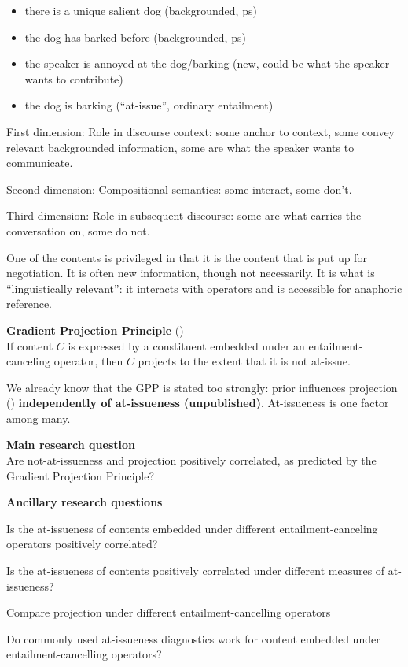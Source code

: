 \documentclass[11pt,fleqn]{article}
\newcommand{\6}{\mbox{$[\hspace*{-.6mm}[$}}
\newcommand{\9}{\mbox{$]\hspace*{-.6mm}]$}}
\begin{document}
\begin{itemize}
\item there is a unique salient dog (backgrounded, ps)
\item the dog has barked before (backgrounded, ps)
\item the speaker is annoyed at the dog/barking (new, could be what the speaker wants to contribute)
\item the dog is barking (``at-issue'', ordinary entailment)
\end{itemize}

First dimension: Role in discourse context: some anchor to context, some convey relevant backgrounded information, some are what the speaker wants to communicate.

Second dimension: Compositional semantics: some interact, some don't.

Third dimension: Role in subsequent discourse: some are what carries the conversation on, some do not.


One of the contents is privileged in that it is the content that is put up for negotiation. It is often new information, though not necessarily. It is what is ``linguistically relevant'': it interacts with operators and is accessible for anaphoric reference.


\begin{exe}
\ex\label{gpp} {\bf Gradient Projection Principle} \hfill (\citealt[400]{tbd-variability}) \\ If content $C$ is expressed by a constituent embedded under an entailment-canceling operator, then $C$ projects to the extent that it is not at-issue.
\end{exe}

We already know that the GPP is stated too strongly: prior influences projection (\citealt{degen-tonhauser-openmind}) {\bf independently of at-issueness (unpublished)}. At-issueness is one factor among many.


\begin{exe}
\ex\label{rqs} {\bf Main research question} \\
Are not-at-issueness and projection positively correlated, as predicted by the Gradient Projection Principle?
\end{exe}

\begin{exe}
\ex\label{rqs} {\bf Ancillary research questions}
\begin{xlist}

\ex Is the at-issueness of contents embedded under different entailment-canceling operators positively correlated?

\ex Is the at-issueness of contents positively correlated under different measures of at-issueness?

\ex Compare projection under different entailment-cancelling operators

\ex Do commonly used at-issueness diagnostics work for content embedded under entailment-cancelling operators?

\end{xlist}
\end{exe}
\end{document}
